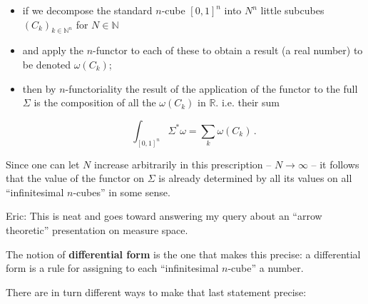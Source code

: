 \documentclass[preprint, 5p, 10pt]{elsarticle}
\theoremstyle{plain}
\begin{document}
\begin{itemize}%
\item if we decompose the standard $n$-cube $[0,1]^n$ into $N^n$ little subcubes $(C_k)_{k\in \mathbb{N}^n}$ for $N \in \mathbb{N}$


\item and apply the $n$-functor to each of these to obtain a result (a real number) to be denoted $\omega(C_k)$;


\item then by $n$-functoriality the result of the application of the functor to the full $\Sigma$ is the composition of all the $\omega(C_k)$ in $\mathbb{R}$. i.e. their sum

\begin{displaymath}
\int_{[0,1]^n} \Sigma^* \omega
  =
  \sum_k \omega(C_k)
  \,.
\end{displaymath}


\end{itemize}
Since one can let $N$ increase arbitrarily in this prescription --{} $N \to \infty$ --{} it follows that the value of the functor on $\Sigma$ is already determined by all its values on all ``{}infinitesimal $n$-cubes''{} in some sense.

Eric: This is neat and goes toward answering my query about an ``{}arrow theoretic''{} presentation on measure space.

The notion of \textbf{differential form} is the one that makes this precise: a differential form is a rule for assigning to each ``{}infinitesimal $n$-cube''{} a number.

There are in turn different ways to make that last statement precise:
\end{document}
